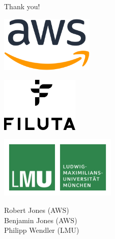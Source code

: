 \documentclass{beamer}
\begin{document}
\begin{frame}{Thank you!}
\begin{center}

\begin{minipage}{0.45\textwidth}
\includegraphics[width=12em]{img/AWSlogo.png}
\end{minipage}
\hfill
\begin{minipage}{0.45\textwidth}
\includegraphics[width=10em]{img/filuta-and-symbol-stacked.png}
\end{minipage}

\bigskip

\begin{minipage}{0.45\textwidth}
\includegraphics[width=15em]{img/LMU.png}
\end{minipage}
\hfill
\begin{minipage}{0.45\textwidth}
\Large
Robert Jones (AWS)\\
Benjamin Jones (AWS)\\
Philipp Wendler (LMU)
\end{minipage}



%
\end{center}
\end{frame}


\end{document}
